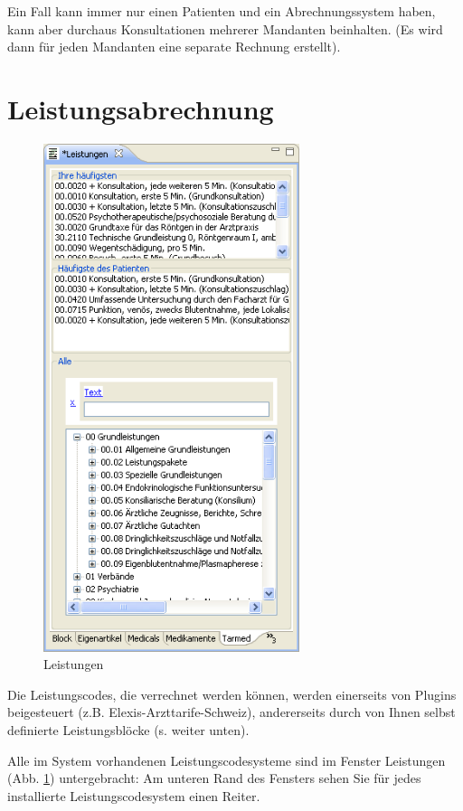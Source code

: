 Ein Fall kann immer nur einen Patienten und ein Abrechnungssystem haben, kann aber durchaus  Konsultationen mehrerer Mandanten beinhalten. (Es wird dann für jeden Mandanten eine separate Rechnung erstellt).

\clearpage

\section{Leistungsabrechnung}
\begin{figure}
    \includegraphics[width=7.5cm]{images/leistungen1}
    \caption{Leistungen}
    \label{fig:leistungen}
\end{figure}
Die Leistungscodes, die verrechnet werden können, werden einerseits von Plugins beigesteuert (z.B. Elexis-Arzttarife-Schweiz), andererseits durch von Ihnen selbst definierte Leistungsblöcke (s. weiter unten).

Alle im System vorhandenen Leistungscodesysteme sind im Fenster \glqq Leistungen\grqq{} (Abb. \ref{fig:leistungen}) untergebracht: Am unteren Rand des Fensters sehen Sie für jedes installierte Leistungscodesystem einen Reiter.


